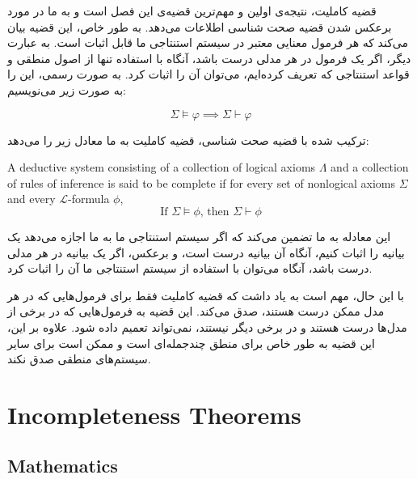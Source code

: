 \documentclass[10pt,a4paper]{article}
\newcommand{\curveL}{\mathcal{L}}
\begin{document}
                قضیه کاملیت، نتیجه‌ی اولین و مهم‌ترین قضیه‌ی این فصل است و به ما در مورد برعکس شدن قضیه صحت شناسی اطلاعات می‌دهد. به طور خاص، این قضیه بیان می‌کند که هر فرمول معنایی معتبر در سیستم استنتاجی ما قابل اثبات است. به عبارت دیگر، اگر یک فرمول در هر مدلی درست باشد، آنگاه با استفاده تنها از اصول منطقی و قواعد استنتاجی که تعریف کرده‌ایم، می‌توان آن را اثبات کرد. به صورت رسمی، این را به صورت زیر می‌نویسیم:

                \begin{equation} 
                    \Sigma \models \varphi \implies \Sigma \vdash \varphi
                \end{equation}
                
ترکیب شده با قضیه صحت شناسی، قضیه کاملیت به ما معادل زیر را می‌دهد:
                
                \begin{define}
                    A deductive system consisting of a collection of logical axioms $\Lambda$ and a collection of rules of inference is said to be complete if for every set of nonlogical axioms $\Sigma$ and every $\curveL$-formula $\phi$,
                    \begin{equation}
                        \text{If } \Sigma\vDash\phi \text{, then } \Sigma\vdash\phi
                    \end{equation}
                \end{define}

این معادله به ما تضمین می‌کند که اگر سیستم استنتاجی ما به ما اجازه می‌دهد یک بیانیه را اثبات کنیم، آنگاه آن بیانیه درست است، و برعکس، اگر یک بیانیه در هر مدلی درست باشد، آنگاه می‌توان با استفاده از سیستم استنتاجی ما آن را اثبات کرد.
                
با این حال، مهم است به یاد داشت که قضیه کاملیت فقط برای فرمول‌هایی که در هر مدل ممکن درست هستند، صدق می‌کند. این قضیه به فرمول‌هایی که در برخی از مدل‌ها درست هستند و در برخی دیگر نیستند، نمی‌تواند تعمیم داده شود. علاوه بر این، این قضیه به طور خاص برای منطق چندجمله‌ای است و ممکن است برای سایر سیستم‌های منطقی صدق نکند.
            \section{Incompleteness Theorems}
                \subsection{Mathematics}
\end{document}
